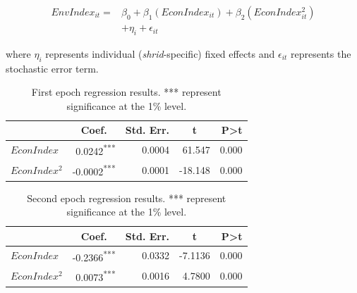 \documentclass[doublespace,times,Afour,review]{template/sagej}
\begin{document}
\begin{align*}
EnvIndex_{it} =& \beta_0 + \beta_1(EconIndex_{it}) + \beta_2(EconIndex_{it}^2) \\ 
                & + \eta_i + \epsilon_{it} 
\end{align*}

where $\eta_i$ represents individual (\textit{shrid}-specific) fixed effects and $\epsilon_{it}$ represents the stochastic error term.


\begin{table}[h]
    \centering
    \begin{tabular}{l|rrrr}
    \hline
    \multicolumn{1}{c}{\textbf{}} & \multicolumn{1}{c}{\textbf{Coef.}} & \multicolumn{1}{c}{\textbf{Std. Err.}} & \multicolumn{1}{c}{\textbf{t}} & \textbf{P\textgreater{}t} \\ \hline
    $EconIndex$                     & 0.0242\textsuperscript{***}                             & 0.0004                                 & 61.547     & 0.000                     \\ 
    $EconIndex^2$                   & -0.0002\textsuperscript{***}                            & 0.0001                                 & -18.148    & 0.000                    
    \\ \hline        
\end{tabular}
\caption{First epoch regression results. *** represent significance at the 1\% level.\label{table:reg1}}
\end{table}


\begin{table}[h]
    \centering
    \begin{tabular}{l|rrrr}
    \hline
    \multicolumn{1}{c}{\textbf{}} & \multicolumn{1}{c}{\textbf{Coef.}} & \multicolumn{1}{c}{\textbf{Std. Err.}} & \multicolumn{1}{c}{\textbf{t}} & \textbf{P\textgreater{}t} \\ \hline
    $EconIndex$                     & -0.2366\textsuperscript{***}                             & 0.0332                                 & -7.1136     & 0.000                     \\ 
    $EconIndex^2$                   & 0.0073\textsuperscript{***}                            & 0.0016                                 & 4.7800    & 0.000                    
    \\ \hline        
\end{tabular}
\caption{Second epoch regression results. *** represent significance at the 1\% level.\label{table:reg2}}
\end{table}
\end{document}
